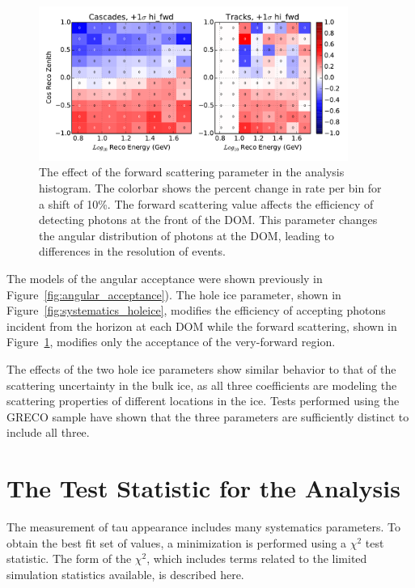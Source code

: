 \begin{figure}
\centering
\includegraphics[width=0.9\textwidth]{systematics/hi_fwd_variation.pdf} 
\caption[Effect of the forward scattering parameter in the analysis histogram]{The effect of the forward scattering parameter in the analysis histogram. The colorbar shows the percent change in rate per bin for a shift of 10\%. The forward scattering value affects the efficiency of detecting photons at the front of the DOM. This parameter changes the angular distribution of photons at the DOM, leading to differences in the resolution of events.}
\label{fig:systematics_hi_fwd}
\end{figure}


The models of the angular acceptance were shown previously in Figure~\ref{fig:angular_acceptance}).
The hole ice parameter, shown in Figure~\ref{fig:systematics_holeice}, modifies the efficiency of accepting photons incident from the horizon at each DOM while the forward scattering, shown in Figure~\ref{fig:systematics_hi_fwd}, modifies only the acceptance of the very-forward region.

The effects of the two hole ice parameters show similar behavior to that of the scattering uncertainty in the bulk ice, as all three coefficients are modeling the scattering properties of different locations in the ice.
Tests performed using the GRECO sample have shown that the three parameters are sufficiently distinct to include all three.










\label{sec:likelihood}
\section{The Test Statistic for the Analysis}
The measurement of tau appearance includes many systematics parameters.
To obtain the best fit set of values, a minimization is performed using a $\chi^2$ test statistic.
The form of the $\chi^2$, which includes terms related to the limited simulation statistics available, is described here.

